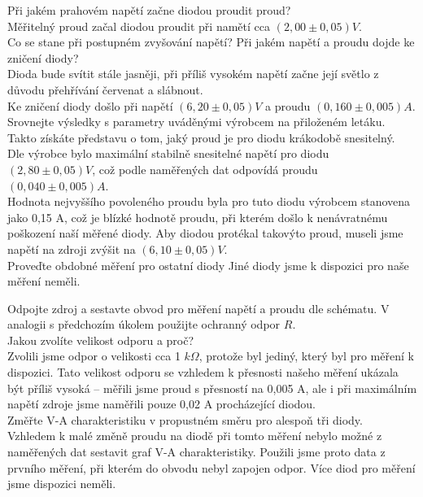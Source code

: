 Při jakém prahovém napětí začne diodou proudit proud?\\
	Měřitelný proud začal diodou proudit při namětí cca $(2,00\pm 0,05)\unit{V}$. \\

Co se stane při postupném zvyšování napětí? Při jakém napětí a proudu dojde ke zničení diody? \\
	Dioda bude svítit stále jasněji, při příliš vysokém napětí začne její světlo z důvodu přehřívání červenat a slábnout. \\
	Ke zničení diody došlo při napětí $(6,20\pm 0,05)\unit{V}$ a proudu $(0,160\pm 0,005)\unit{A}$. \\

Srovnejte výsledky s parametry uváděnými výrobcem na přiloženém letáku. Takto získáte představu o tom, jaký proud je pro diodu krákodobě snesitelný. \\
	Dle výrobce bylo maximální stabilně snesitelné napětí pro diodu $(2,80\pm 0,05)\unit{V}$, což podle naměřených dat odpovídá proudu $(0,040\pm 0,005)\unit{A}$. \\
	Hodnota nejvyššího povoleného proudu byla pro tuto diodu výrobcem stanovena jako 0,15 A, což je blízké hodnotě proudu, při kterém došlo k nenávratnému poškození naší měřené diody. Aby diodou protékal takovýto proud, museli jsme napětí na zdroji zvýšit na $(6,10\pm 0,05)\unit{V}$. \\
	
Proveďte obdobné měření pro ostatní diody
	Jiné diody jsme k dispozici pro naše měření neměli.
	
Odpojte zdroj a sestavte obvod pro měření napětí a proudu dle schématu. %
V analogii s předchozím úkolem použijte ochranný odpor $R$. \\

Jakou zvolíte velikost odporu a proč? \\
	Zvolili jsme odpor o velikosti cca 1 $\unit{k\Omega}$, protože byl jediný, který byl pro měření k dispozici. Tato velikost odporu se vzhledem k přesnosti našeho měření ukázala být příliš vysoká -- měřili jsme proud s přesností na 0,005 A, ale i při maximálním napětí zdroje jsme naměřili pouze 0,02 A procházející diodou. \\
	
Změřte V-A charakteristiku v propustném směru pro alespoň tři diody. \\
	Vzhledem k malé změně proudu na diodě při tomto měření nebylo možné z naměřených dat sestavit graf V-A charakteristiky. Použili jsme proto data z prvního měření, při kterém do obvodu nebyl zapojen odpor. Více diod pro měření jsme dispozici neměli. \\
